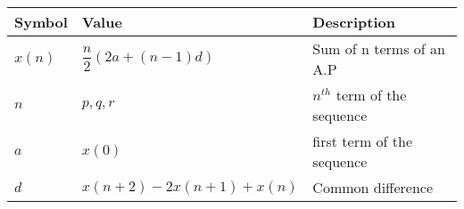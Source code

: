 
\begin{tabular}{|p{2.5cm}|p{2.5cm}|p{2.55cm}|}
\hline
Symbol&Value&Description\\ \hline
$x(n)$&{$\dfrac{n}{2}(2a+(n-1)d)$}&Sum of n terms of an A.P\\ \hline
$n$&$p,q,r$&$n^{th}$ term of the sequence\\ \hline
$a$&$x(0)$&first term of the sequence\\ \hline
$d$&\tiny$x(n+2)-2x(n+1)+x(n)$&Common difference\\ \hline
\end{tabular}
